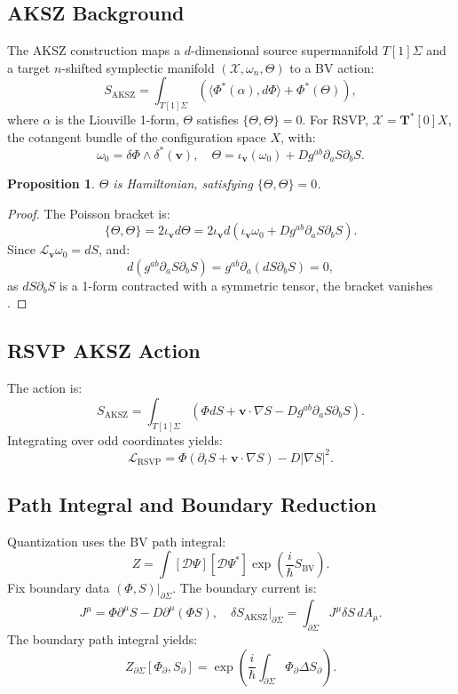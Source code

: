\documentclass[12pt]{article}
\newtheorem{proposition}{Proposition}
\begin{document}
\subsection{AKSZ Background}

The AKSZ construction maps a \(d\)-dimensional source supermanifold \(T[1]\Sigma\) and a target \(n\)-shifted symplectic manifold \((\mathcal{X}, \omega_n, \Theta)\) to a BV action:
\[
S_{\mathrm{AKSZ}} = \int_{T[1]\Sigma} \left( \langle \Phi^*(\alpha), d\Phi \rangle + \Phi^*(\Theta) \right),
\]
where \(\alpha\) is the Liouville 1-form, \(\Theta\) satisfies \(\{\Theta, \Theta\} = 0\). For RSVP, \(\mathcal{X} = \mathbf{T}^*[0]X\), the cotangent bundle of the configuration space \(X\), with:
\[
\omega_0 = \delta \Phi \wedge \delta^* (\mathbf{v}), \quad \Theta = \iota_{\mathbf{v}}(\omega_0) + D g^{ab} \partial_a S \partial_b S.
\]

\begin{proposition}
\label{prop:aks}
\(\Theta\) is Hamiltonian, satisfying \(\{\Theta, \Theta\} = 0\).
\end{proposition}

\begin{proof}
The Poisson bracket is:
\[
\{\Theta, \Theta\} = 2 \iota_{\mathbf{v}} d\Theta = 2 \iota_{\mathbf{v}} d \left( \iota_{\mathbf{v}} \omega_0 + D g^{ab} \partial_a S \partial_b S \right).
\]
Since \(\mathcal{L}_{\mathbf{v}} \omega_0 = dS\), and:
\[
d (g^{ab} \partial_a S \partial_b S) = g^{ab} \partial_a (d S \partial_b S) = 0,
\]
as \(d S \partial_b S\) is a 1-form contracted with a symmetric tensor, the bracket vanishes \citep{Alexandrov1997}.
\end{proof}

\subsection{RSVP AKSZ Action}

The action is:
\[
S_{\mathrm{AKSZ}} = \int_{T[1]\Sigma} \left( \Phi dS + \mathbf{v} \cdot \nabla S - D g^{ab} \partial_a S \partial_b S \right).
\]
Integrating over odd coordinates yields:
\[
\mathcal{L}_{\mathrm{RSVP}} = \Phi (\partial_t S + \mathbf{v} \cdot \nabla S) - D |\nabla S|^2.
\]

\subsection{Path Integral and Boundary Reduction}

Quantization uses the BV path integral:
\[
Z = \int [\mathcal{D}\Psi][\mathcal{D}\Psi^*] \exp\left( \frac{i}{\hbar} S_{\mathrm{BV}} \right).
\]
Fix boundary data \((\Phi, S)|_{\partial \Sigma}\). The boundary current is:
\[
J^\mu = \Phi \partial^\mu S - D \partial^\mu (\Phi S), \quad \delta S_{\mathrm{AKSZ}}|_{\partial \Sigma} = \int_{\partial \Sigma} J^\mu \delta S \, dA_\mu.
\]
The boundary path integral yields:
\[
Z_{\partial \Sigma}[\Phi_{\partial}, S_{\partial}] = \exp\left( \frac{i}{\hbar} \int_{\partial \Sigma} \Phi_{\partial} \Delta S_{\partial} \right).
\]
\end{document}
